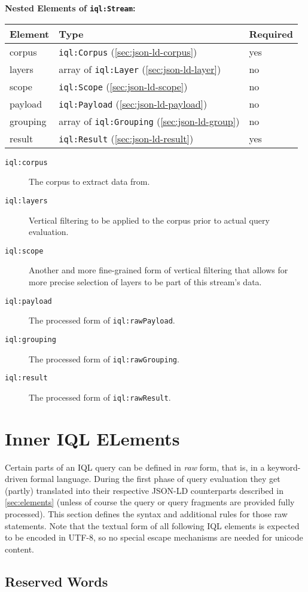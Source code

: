 \documentclass[11pt,a4paper,portrait]{article}
\newcommand{\iql}{IQL\xspace}
\newcommand{\iqlns}{iql:}
\newcommand{\iqlType}[1]{\texttt{\iqlns#1}}
\newenvironment{elements}[1]{
\noindent\textbf{Nested Elements of #1:}\newline\medskip
\begin{tabular}{|p{0.3\textwidth}|p{0.42\textwidth}|p{0.17\textwidth}|}
	\hline
	\textbf{Element} & \textbf{Type} & \textbf{Required} \\ 
	\hline
	\hline
}{
\end{tabular}
}
\newcommand{\element}[3]{
#1 & #2 & #3 \\
\hline
}
\begin{document}
\begin{elements}{\iqlType{Stream}}
	\element{corpus}{\iqlType{Corpus} (\ref{sec:json-ld-corpus})}{yes}
	\element{layers}{array of \iqlType{Layer} (\ref{sec:json-ld-layer})}{no}
	\element{scope}{\iqlType{Scope} (\ref{sec:json-ld-scope})}{no}
	\element{payload}{\iqlType{Payload} (\ref{sec:json-ld-payload})}{no}
	\element{grouping}{array of \iqlType{Grouping} (\ref{sec:json-ld-group})}{no}
	\element{result}{\iqlType{Result} (\ref{sec:json-ld-result})}{yes}
\end{elements}
\begin{description}
	\item[\iqlType{corpus}] The corpus to extract data from.
	\item[\iqlType{layers}] Vertical filtering to be applied to the corpus prior to actual query evaluation.
	\item[\iqlType{scope}] Another and more fine-grained form of vertical filtering that allows for more precise selection of layers to be part of this stream's data.
	\item[\iqlType{payload}] The processed form of \iqlType{rawPayload}.
	\item[\iqlType{grouping}] The processed form of \iqlType{rawGrouping}.
	\item[\iqlType{result}] The processed form of \iqlType{rawResult}.
\end{description}


\section{Inner \iql ELements}
\label{sec:inner-iql-elements}

Certain parts of an \iql query can be defined in \textit{raw} form, that is, in a keyword-driven formal language.
During the first phase of query evaluation they get (partly) translated into their respective JSON-LD counterparts described in \cref{sec:elements} (unless of course the query or query fragments are provided fully processed).
This section defines the syntax and additional rules for those raw statements.
Note that the textual form of all following \iql elements is expected to be encoded in UTF-8, so no special escape mechanisms are needed for unicode content.




\subsection{Reserved Words}
\label{sec:reserved-words}
\end{document}
